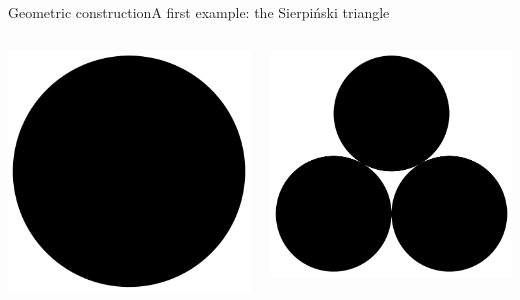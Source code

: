 \documentclass[xcolor=x11names,compress,professionalfonts]{beamer}
\renewcommand{\(}{\begin{columns}}
\renewcommand{\)}{\end{columns}}
\newcommand{\<}[1]{\begin{column}{#1}}
\renewcommand{\>}{\end{column}}
\begin{document}
\begin{frame}{Geometric construction}{A first example: the Sierpiński triangle}
\begin{itemize}
\begin{columns}
\newcommand{\s}{.2}
  \begin{column}{3cm}
    \includegraphics[scale=\s]{sierpinksi_ball_0.pdf}
  \end{column}

  \begin{column}{3cm}
     \includegraphics[scale=\s]{sierpinksi_ball_1.pdf}
  \end{column}
  

\end{columns}
\end{itemize}
\end{frame}
\end{document}
